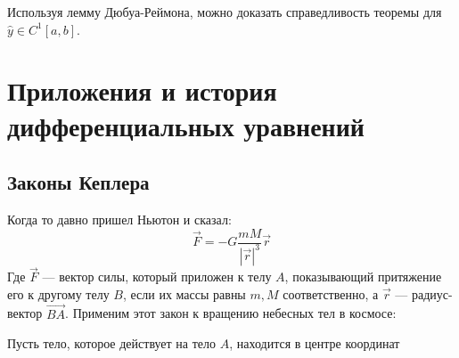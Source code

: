 \begin{note}
    Используя лемму Дюбуа-Реймона, можно доказать справедливость теоремы для \(\hat{y} \in C^1[a, b]\).
\end{note}


\section{Приложения и история дифференциальных уравнений}
\subsection{Законы Кеплера}
Когда то давно пришел Ньютон и сказал:
\[\vec{F} = -G \frac{mM}{|\vec{r}|^3}\vec{r}\]
Где \(\vec{F}\) --- вектор силы, который приложен к телу \(A\), показывающий притяжение его к другому телу \(B\), если их массы равны \(m, M\) соответственно, а \(\vec{r}\) --- радиус-вектор \(\vec{BA}\). Применим этот закон к вращению небесных тел в космосе:
 
Пусть тело, которое действует на тело \(A\), находится в центре координат
